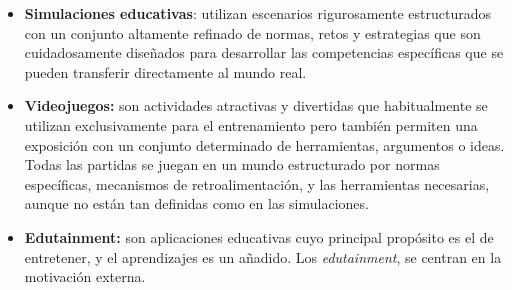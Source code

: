 \begin{itemize}
\item \textbf{Simulaciones educativas}: utilizan escenarios rigurosamente
    estructurados con un conjunto altamente refinado de normas, retos y
    estrategias que son cuidadosamente diseñados para desarrollar las
    competencias específicas que se pueden transferir directamente al mundo
    real.
\item \textbf{Videojuegos:} son actividades atractivas y divertidas que
    habitualmente se utilizan exclusivamente para el entrenamiento pero también
    permiten una exposición con un conjunto determinado de herramientas,
    argumentos o ideas. Todas las partidas se juegan en un mundo estructurado
    por normas específicas, mecanismos de retroalimentación, y las herramientas
    necesarias, aunque no están tan definidas como en las simulaciones.
\item \textbf{Edutainment:} son aplicaciones educativas cuyo principal propósito
    es el de entretener, y el aprendizajes es un añadido. Los
    \emph{edutainment}, se centran en la motivación externa.
\end{itemize}

